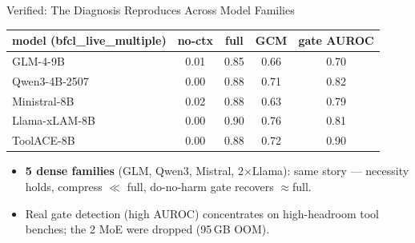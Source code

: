 \begin{frame}{Verified: The Diagnosis Reproduces Across Model Families}
  \small
  \begin{table}\centering
    \begin{tabular}{lcccc}
      \toprule
      model (bfcl\_live\_multiple) & no-ctx & full & GCM & gate AUROC \\
      \midrule
      GLM-4-9B & 0.01 & 0.85 & 0.66 & 0.70 \\
      Qwen3-4B-2507 & 0.00 & 0.88 & 0.71 & 0.82 \\
      Ministral-8B & 0.02 & 0.88 & 0.63 & 0.79 \\
      Llama-xLAM-8B & 0.00 & 0.90 & 0.76 & 0.81 \\
      ToolACE-8B & 0.00 & 0.88 & 0.72 & 0.90 \\
      \bottomrule
    \end{tabular}
  \end{table}
  \begin{itemize}
    \item \textbf{5 dense families} (GLM, Qwen3, Mistral, 2$\times$Llama): same story --- necessity holds, compress $\ll$ full, do-no-harm gate recovers $\approx$full.
    \item Real gate detection (high AUROC) concentrates on high-headroom tool benches; the 2 MoE were dropped (95\,GB OOM).
  \end{itemize}
\end{frame}

